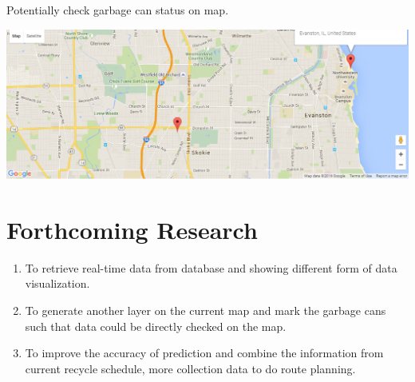 \documentclass[a0b,portrait]{a0poster}
\begin{document}
\begin{multicols}{3}
\begin{center}
\end{center}
Potentially check garbage can status on map.
\begin{center}
\includegraphics[width=\linewidth]{status.PNG}
\end{center}

\color{Black} %

\section*{Forthcoming Research}
\begin{enumerate}
\item To retrieve real-time data from database and showing different form of data visualization.
\item To generate another layer on the current map and mark the garbage cans such that data could be directly checked on the map.
\item To improve the accuracy of prediction and combine the information from current recycle schedule, more collection data to do route planning. 
\end{enumerate}

\end{multicols}
\end{document}
